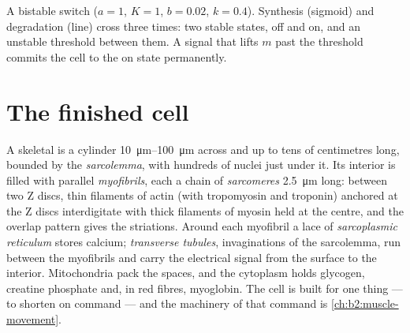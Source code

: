 \begin{omfigure}

{\small A bistable switch ($a = 1$, $K = 1$, $b = 0.02$, $k = 0.4$).
Synthesis (sigmoid) and degradation (line) cross three times: two
stable states, off and on, and an unstable threshold between them.
A signal that lifts $m$ past the threshold commits the cell to the
on state permanently.}
\end{omfigure}

\section{The finished cell}

\begin{definition}\label{def:b2:cell-differentiation:fibre}
A skeletal  is a cylinder \qtyrange{10}{100}{\micro m}
across and up to tens of centimetres long, bounded by the
\emph{sarcolemma}, with hundreds of nuclei just under it. Its
interior is filled with parallel \emph{myofibrils}, each a chain of
\emph{sarcomeres} \qty{2.5}{\micro m} long: between two Z discs, thin
filaments of actin (with tropomyosin and troponin) anchored at the
Z discs interdigitate with thick filaments of myosin held at the
centre, and the overlap pattern gives the striations. Around each
myofibril a lace of \emph{sarcoplasmic reticulum} stores calcium;
\emph{transverse tubules}, invaginations of the sarcolemma, run
between the myofibrils and carry the electrical signal from the
surface to the interior. Mitochondria pack the spaces, and the
cytoplasm holds glycogen, creatine phosphate and, in red fibres,
myoglobin. The cell is built for one thing --- to shorten on command
--- and the machinery of that command is
\cref{ch:b2:muscle-movement}.
\end{definition}

